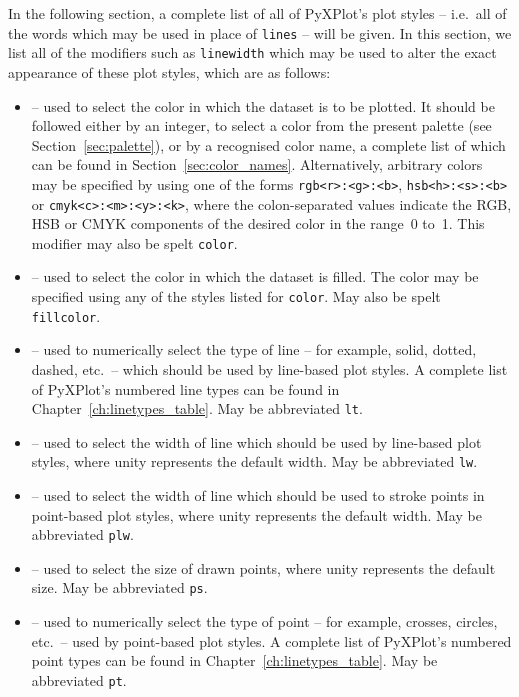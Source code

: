In the following section, a complete list of all of PyXPlot's plot styles --
i.e.\ all of the words which may be used in place of {\tt lines} -- will be
given. In this section, we list all of the modifiers such as {\tt line\-width}
which may be used to alter the exact appearance of these plot styles, which are
as follows:
\begin{itemize}
\item {} -- used to select the color in which the dataset is to be plotted. It should be followed either by an integer, to select a color from the present palette (see Section~\ref{sec:palette}), or by a recognised color name, a complete list of which can be found in Section~\ref{sec:color_names}. Alternatively, arbitrary colors may be specified by using one of the forms {\tt rgb<r>:\-<g>:\-<b>}, {\tt hsb<h>:\-<s>:\-<b>} or {\tt cmyk<c>:\-<m>:\-<y>:\-<k>}, where the colon-separated values indicate the RGB, HSB or CMYK components of the desired color in the range~0 to~1. This modifier may also be spelt {\tt color}.
\item {} -- used to select the color in which the dataset is filled. The color may be specified using any of the styles listed for {\tt color}. May also be spelt {\tt fillcolor}.
\item {} -- used to numerically select the type of line -- for example, solid, dotted, dashed, etc.\ -- which should be used by line-based plot styles. A complete list of PyXPlot's numbered line types can be found in Chapter~\ref{ch:linetypes_table}. May be abbreviated {\tt lt}.
\item {} -- used to select the width of line which should be used by line-based plot styles, where unity represents the default width. May be abbreviated {\tt lw}.
\item {} -- used to select the width of line which should be used to stroke points in point-based plot styles, where unity represents the default width. May be abbreviated {\tt plw}.
\item {} -- used to select the size of drawn points, where unity represents the default size. May be abbreviated {\tt ps}.
\item {} -- used to numerically select the type of point -- for example, crosses, circles, etc.\ -- used by point-based plot styles. A complete list of PyXPlot's numbered point types can be found in Chapter~\ref{ch:linetypes_table}. May be abbreviated {\tt pt}.
\end{itemize}

